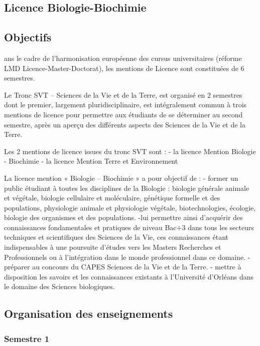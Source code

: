 \documentclass[10pt, a5paper]{report}
\begin{document}
\begin{spacing}{1.5}

\chapter*{Licence Biologie-Biochimie}

\footnotesize
\section*{Objectifs}



ans le cadre de l’harmonisation européenne des cursus universitaires (réforme LMD Licence-Master-Doctorat), les mentions de  Licence sont constituées de 6 semestres.

Le Tronc SVT – Sciences de la Vie et de la Terre, est organisé en 2 semestres dont le premier, largement pluridisciplinaire, est intégralement commun à trois mentions de licence pour permettre aux étudiants de se déterminer au second semestre, après un aperçu des différents aspects des Sciences de la Vie et de la Terre.

Les 2 mentions de licence  issues du tronc SVT sont :
-    la licence Mention  Biologie - Biochimie
-    la licence Mention  Terre et Environnement

La licence mention « Biologie – Biochimie »  a pour  objectif de :
     - former un public étudiant à toutes les disciplines de la Biologie : biologie générale animale et végétale, biologie cellulaire et moléculaire, génétique formelle et des populations, physiologie animale et physiologie végétale, biotechnologies, écologie, biologie des organismes et des populations. 
     -lui permettre ainsi d’acquérir des connaissances fondamentales et pratiques de niveau Bac+3 dans tous les secteurs techniques et scientifiques des Sciences de la Vie, ces connaissances étant indispensables à une poursuite d’études vers les Masters Recherches et Professionnels ou à l’intégration dans le monde professionnel dans ce domaine.
    - préparer au concours du CAPES Sciences de la Vie et de la Terre.
    - mettre à disposition les savoirs et les connaissances existants à l’Université d’Orléans dans le domaine des Sciences biologiques.

\section*{Organisation des enseignements}
\subsection*{Semestre 1}


\end{spacing}
\end{document}
